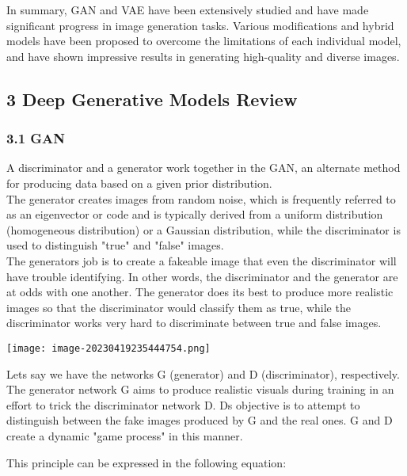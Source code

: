 \documentclass[
]{article}
\begin{document}
In summary, GAN and VAE have been extensively studied and have made
significant progress in image generation tasks. Various modifications
and hybrid models have been proposed to overcome the limitations of each
individual model, and have shown impressive results in generating
high-quality and diverse images.

\hypertarget{3-deep-generative-models-review}{%
\subsection{3 Deep Generative Models
Review}\label{3-deep-generative-models-review}}

\hypertarget{31-gan}{%
\subsubsection{3.1 GAN}\label{31-gan}}

A discriminator and a generator work together in the GAN, an alternate
method for producing data based on a given prior distribution.\\
The generator creates images from random noise, which is frequently
referred to as an eigenvector or code and is typically derived from a
uniform distribution (homogeneous distribution) or a Gaussian
distribution, while the discriminator is used to distinguish "true" and
"false" images.\\
The generator\textquotesingle s job is to create a fakeable image that
even the discriminator will have trouble identifying. In other words,
the discriminator and the generator are at odds with one another. The
generator does its best to produce more realistic images so that the
discriminator would classify them as true, while the discriminator works
very hard to discriminate between true and false images.

\texttt{[image: image-20230419235444754.png]}

Let\textquotesingle s say we have the networks G (generator) and D
(discriminator), respectively. The generator network G aims to produce
realistic visuals during training in an effort to trick the
discriminator network D. D\textquotesingle s objective is to attempt to
distinguish between the fake images produced by G and the real ones. G
and D create a dynamic "game process" in this manner.

This principle can be expressed in the following equation:
\end{document}

